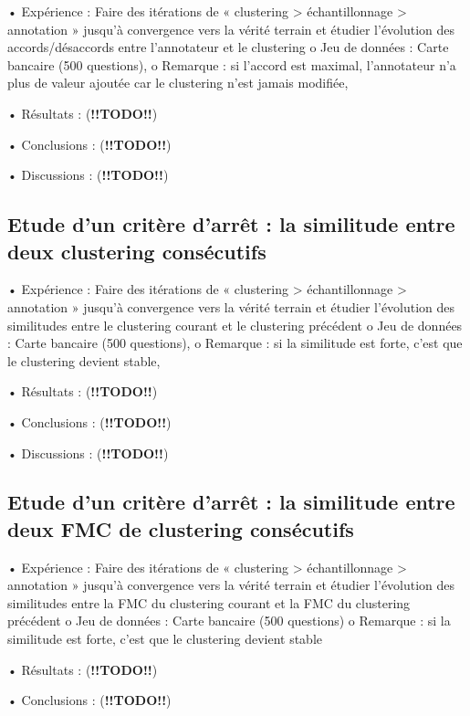         •	Expérience : Faire des itérations de « clustering > échantillonnage > annotation » jusqu’à convergence vers la vérité terrain et étudier l’évolution des accords/désaccords entre l’annotateur et le clustering
            o	Jeu de données : Carte bancaire (500 questions),
            o	Remarque : si l’accord est maximal, l’annotateur n’a plus de valeur ajoutée car le clustering n’est jamais modifiée,

        •	Résultats : (\textbf{!!TODO!!})
        
        •	Conclusions : (\textbf{!!TODO!!})

        •	Discussions : (\textbf{!!TODO!!})


        \subsection{Etude d’un critère d’arrêt : la similitude entre deux clustering consécutifs}

        •	Expérience : Faire des itérations de « clustering > échantillonnage > annotation » jusqu’à convergence vers la vérité terrain et étudier l’évolution des similitudes entre le clustering courant et le clustering précédent
            o	Jeu de données : Carte bancaire (500 questions),
            o	Remarque : si la similitude est forte, c’est que le clustering devient stable,
        
        •	Résultats : (\textbf{!!TODO!!})

        •	Conclusions : (\textbf{!!TODO!!})

        •	Discussions : (\textbf{!!TODO!!})


        \subsection{Etude d’un critère d’arrêt : la similitude entre deux FMC de clustering consécutifs}

        •	Expérience : Faire des itérations de « clustering > échantillonnage > annotation » jusqu’à convergence vers la vérité terrain et étudier l’évolution des similitudes entre la FMC du clustering courant et la FMC du clustering précédent
            o	Jeu de données : Carte bancaire (500 questions)
            o	Remarque : si la similitude est forte, c’est que le clustering devient stable

        •	Résultats : (\textbf{!!TODO!!})

        •	Conclusions : (\textbf{!!TODO!!})

